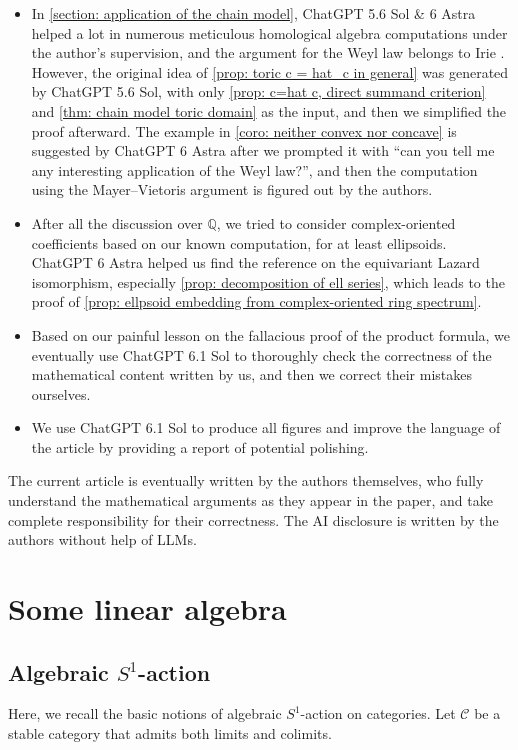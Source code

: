 \documentclass[11pt]{amsart}
\numberwithin{equation}{section}
\theoremstyle{plain}
\theoremstyle{definition}
\theoremstyle{remark}
\newcommand{\bQ} { {\mathbb{Q}}}
\newcommand{\cC} { {\mathcal{C}}}
\begin{document}
\begin{itemize}[fullwidth]
\item In \autoref{section: application of the chain model}, ChatGPT 5.6 Sol \& 6 Astra helped a lot in numerous meticulous homological algebra computations under the author's supervision, and the argument for the Weyl law belongs to Irie \cite{Irie_ChainModel}. However, the original idea of \autoref{prop: toric c = hat_c in general} was generated by ChatGPT 5.6 Sol, with only  \autoref{prop: c=hat c, direct summand criterion} and \autoref{thm: chain model toric domain} as the input, and then we simplified the proof afterward. The example in \autoref{coro: neither convex nor concave} is suggested by ChatGPT 6 Astra after we prompted it with ``can you tell me any interesting application of the Weyl law?'', and then the computation using the Mayer--Vietoris argument is figured out by the authors. 

\item After all the discussion over $\bQ$, we tried to consider complex-oriented coefficients based on our known computation, for at least ellipsoids. ChatGPT 6 Astra helped us find the reference \cite{Hausmann2022} on the equivariant Lazard isomorphism, especially \autoref{prop: decomposition of ell series}, which leads to the proof of \autoref{prop: ellpsoid embedding from complex-oriented ring spectrum}.

\item Based on our painful lesson on the fallacious proof of the product formula, we eventually use ChatGPT 6.1 Sol to thoroughly check the correctness of the mathematical content written by us, and then we correct their mistakes ourselves.



\item We use ChatGPT 6.1 Sol to produce all figures and improve the language of the article by providing a report of potential polishing.
\end{itemize}

The current article is eventually written by the authors themselves, who fully understand the mathematical arguments as they appear in the paper, and take complete responsibility for their correctness. The AI disclosure is written by the authors without help of LLMs.




\section{Some linear algebra}

\subsection{\texorpdfstring{Algebraic $S^1$-action}{}}
Here, we recall the basic notions of algebraic $S^1$-action on categories. Let $\cC$ be a stable category that admits both limits and colimits.
\end{document}
